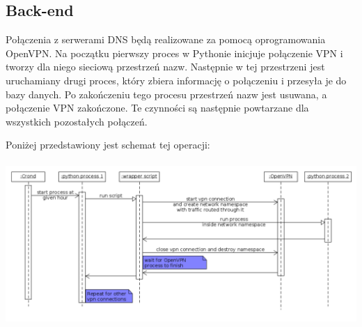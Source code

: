 \subsection{Back-end}

\hspace{0.5cm} Połączenia z serwerami DNS będą realizowane za pomocą oprogramowania OpenVPN. Na początku pierwszy proces w Pythonie inicjuje połączenie VPN i tworzy dla niego sieciową przestrzeń nazw. Następnie w tej przestrzeni jest uruchamiany drugi proces, który zbiera informację o połączeniu i przesyła je do bazy danych. Po zakończeniu tego procesu przestrzeń nazw jest usuwana, a połączenie VPN zakończone. Te czynności są następnie powtarzane dla wszystkich pozostałych połączeń. 

Poniżej przedstawiony jest schemat tej operacji: 
\\~\\
\includegraphics[scale=0.65]{connection_schema.png}
